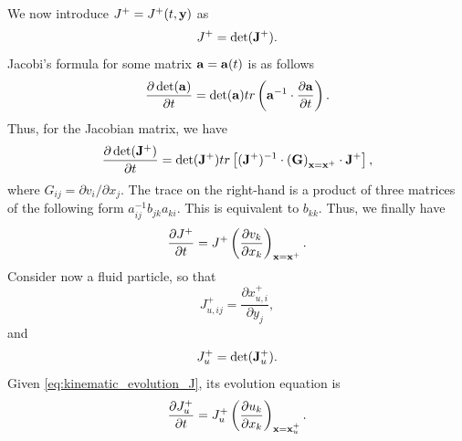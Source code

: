 \documentclass[oneside,a4paper,11pt]{report}
\begin{document}
We now introduce $J^+ = J^+(t,\mathbf{y})$ as
\begin{equation}
    J^+ = \det (\mathbf{J}^+).
\end{equation}
Jacobi's formula for some matrix $\mathbf{a} = \mathbf{a}(t)$ is as follows
\begin{equation}
    \frac{\partial \det( \mathbf{a} )}{\partial t} = \det( \mathbf{a} ) tr \left ( \mathbf{a}^{-1} \cdot \frac{\partial \mathbf{a}}{\partial t} \right ).
\end{equation}
Thus, for the Jacobian matrix, we have
\begin{equation}
    \frac{\partial \det(\mathbf{J}^+) }{\partial t} = \det( \mathbf{J}^+ ) tr \left [ (\mathbf{J}^+)^{-1} \cdot \left ( \mathbf{G} \right )_{\mathbf{x} = \mathbf{x}^+} \cdot \mathbf{J}^+ \right ],
\end{equation}
where $G_{ij} = \partial v_i / \partial x_j$. The trace on the right-hand is a product of three matrices of the following form $a^{-1}_{ij} b_{jk} a_{ki}$. This is equivalent to $b_{kk}$.
Thus, we finally have
\begin{equation}
    \label{eq:kinematic_evolution_J}
    \frac{\partial J^+}{\partial t} = J^+ \left (\frac{\partial v_k}{\partial x_k} \right )_{\mathbf{x} = \mathbf{x}^+}.
\end{equation}
Consider now a fluid particle, so that 
\begin{equation}
    \label{eq:kinematic_Jacobian_def_fluid}
    J_{u,ij}^+ = \frac{\partial x_{u,i}^+}{\partial y_j},
\end{equation}
and
\begin{equation}
    J_u^+ = \det(\mathbf{J}_u^+).
\end{equation}
Given \cref{eq:kinematic_evolution_J}, its evolution equation is
\begin{equation}
    \label{eq:kinematic_evolution_J_fluid}
    \frac{\partial J^+_u}{\partial t} = J^+_u \left (\frac{\partial u_k}{\partial x_k} \right )_{\mathbf{x} = \mathbf{x}^+_u}.
\end{equation}   

\end{document}
